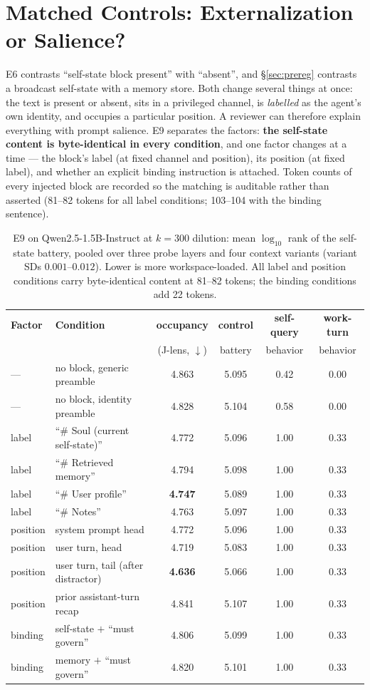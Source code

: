 \documentclass[11pt]{article}
\newcommand{\jlens}{J\mbox{-}lens}
\begin{document}
\section{Matched Controls: Externalization or Salience?}
\label{sec:e9}
E6 contrasts ``self-state block present'' with ``absent'', and \S\ref{sec:prereg} contrasts a broadcast self-state with a memory store. Both change several things at once: the text is present or absent, sits in a privileged channel, is \emph{labelled} as the agent's own identity, and occupies a particular position. A reviewer can therefore explain everything with prompt salience. E9 separates the factors: \textbf{the self-state content is byte-identical in every condition}, and one factor changes at a time --- the block's label (at fixed channel and position), its position (at fixed label), and whether an explicit binding instruction is attached. Token counts of every injected block are recorded so the matching is auditable rather than asserted (81--82 tokens for all label conditions; 103--104 with the binding sentence).

\begin{table}[h]
\centering\small
\begin{tabular}{llcccc}
\toprule
\textbf{Factor} & \textbf{Condition} & \textbf{occupancy} & \textbf{control} & \textbf{self-query} & \textbf{work-turn} \\
 & & (\jlens{}, $\downarrow$) & battery & behavior & behavior \\
\midrule
--- & no block, generic preamble & 4.863 & 5.095 & 0.42 & 0.00 \\
--- & no block, identity preamble & 4.828 & 5.104 & 0.58 & 0.00 \\
\midrule
label & ``\# Soul (current self-state)'' & 4.772 & 5.096 & 1.00 & 0.33 \\
label & ``\# Retrieved memory'' & 4.794 & 5.098 & 1.00 & 0.33 \\
label & ``\# User profile'' & \textbf{4.747} & 5.089 & 1.00 & 0.33 \\
label & ``\# Notes'' & 4.763 & 5.097 & 1.00 & 0.33 \\
\midrule
position & system prompt head & 4.772 & 5.096 & 1.00 & 0.33 \\
position & user turn, head & 4.719 & 5.083 & 1.00 & 0.33 \\
position & user turn, tail (after distractor) & \textbf{4.636} & 5.066 & 1.00 & 0.33 \\
position & prior assistant-turn recap & 4.841 & 5.107 & 1.00 & 0.33 \\
\midrule
binding & self-state $+$ ``must govern'' & 4.806 & 5.099 & 1.00 & 0.33 \\
binding & memory $+$ ``must govern'' & 4.820 & 5.101 & 1.00 & 0.33 \\
\bottomrule
\end{tabular}
\caption{E9 on Qwen2.5-1.5B-Instruct at $k{=}300$ dilution: mean $\log_{10}$ rank of the self-state battery, pooled over three probe layers and four context variants (variant SDs $0.001$--$0.012$). Lower is more workspace-loaded. All label and position conditions carry byte-identical content at 81--82 tokens; the binding conditions add 22 tokens.}
\label{tab:e9}
\end{table}
\end{document}

